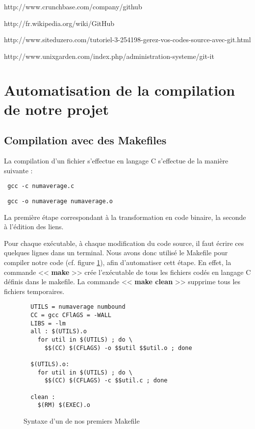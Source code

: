 http://www.crunchbase.com/company/github

http://fr.wikipedia.org/wiki/GitHub

http://www.siteduzero.com/tutoriel-3-254198-gerez-vos-codes-source-avec-git.html

http://www.unixgarden.com/index.php/administration-systeme/git-it


\section{Automatisation de la compilation de notre projet}
\subsection{Compilation avec des Makefiles}

La compilation d'un fichier s'effectue en langage C s'effectue de la mani\`ere suivante :
\begin{verbatim} gcc -c numaverage.c\end{verbatim}
\begin{verbatim} gcc -o numaverage numaverage.o\end{verbatim}

La premi\`ere \'etape correspondant \`a la transformation en code binaire, la seconde \`a l'\'edition des liens.

Pour chaque ex\'ecutable, \`a chaque modification du code source, il faut \'ecrire ces quelques lignes dans un terminal.
Nous avons donc utilis\'e le Makefile pour compiler notre code (cf. figure \ref{fig:exemple_makefile}), afin d'automatiser cett \'etape.
En effet, la commande << \textbf{make} >> cr\'ee l'ex\'ecutable de tous les fichiers cod\'es en langage C d\'efinis dans le makefile. La commande
<< \textbf{make clean} >> supprime tous les fichiers temporaires.
\newline
\begin{figure}[h] 
\begin{center}

\begin{minipage}[|c|]{0.7\linewidth}
\begin{verbatim}
  UTILS = numaverage numbound
  CC = gcc CFlAGS = -WALL
  LIBS = -lm
  all : $(UTILS).o
    for util in $(UTILS) ; do \
      $$(CC) $(CFLAGS) -o $$util $$util.o ; done

  $(UTILS).o:
    for util in $(UTILS) ; do \
      $$(CC) $(CFLAGS) -c $$util.c ; done

  clean :
    $(RM) $(EXEC).o
\end{verbatim}
\end{minipage}
\end{center}
\caption{Syntaxe d'un de nos premiers Makefile}
\label{fig:exemple_makefile}
\end{figure}

